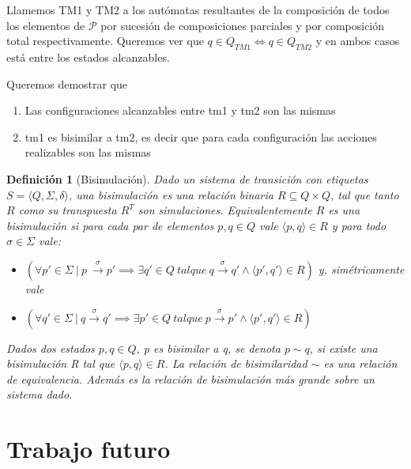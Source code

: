 \documentclass[paper=a4, fontsize=11pt, spanish]{scrartcl} %
\numberwithin{equation}{section} %
\numberwithin{figure}{section} %
\numberwithin{table}{section} %
\newtheorem{definition}{Definición}
\begin{document}
Llamemos TM1 y TM2 a los autómatas resultantes de la composición de todos los elementos de $\mathcal{P}$ por sucesión de composiciones parciales y por composición total respectivamente. Queremos ver que $ q \in Q_{TM1} \iff q \in Q_{TM2} $ y en ambos casos está entre los estados alcanzables. 

Queremos demostrar que
\begin{enumerate}
\item Las configuraciones alcanzables entre tm1 y tm2 son las mismas
\item tm1 es bisimilar a tm2, es decir que para cada configuración las acciones realizables son las mismas
\end{enumerate}

\begin{definition}[Bisimulación]
Dado un sistema de transición con etiquetas $ S =\langle Q, \Sigma, \delta \rangle $, una bisimulación es una relación binaria $R \subseteq Q \times Q$, tal que tanto $R$ como su transpuesta $R^T$ son simulaciones. Equivalentemente $R$ es una bisimulación si para cada par de elementos $p, q \in Q$ vale $\langle p, q \rangle \in R$ y para todo $\sigma \in \Sigma $ vale:
\begin{itemize}
    \item $(\forall p' \in \Sigma \  | \  p \ \overset{\sigma}{\rightarrow} p' \implies \exists q'\in Q \ \mathit{tal que} \ q \overset{\sigma}{\rightarrow} q' \land \langle p', q' \rangle \in R )$ y, simétricamente vale 
    \item $(\forall q' \in \Sigma \  | \  q \overset{\sigma}{\rightarrow} q' \implies \exists p'\in Q \ \mathit{tal que} \ p \overset{\sigma}{\rightarrow} p' \land \langle p', q' \rangle \in R ) $
\end{itemize}

Dados dos estados $p, q \in Q $, p es bisimilar a q, se denota $p \sim q $, si existe una bisimulación R tal que $\langle p,q \rangle \in R$. La relación de bisimilaridad $\sim$ es una relación de equivalencia. Además es la relación de bisimulación más grande sobre un sistema dado.

\end{definition}


\section{Trabajo futuro} 
\end{document}
